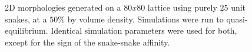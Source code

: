 \documentclass[twocolumn,a4,notitlepage]{report}
\begin{document}
\begin{figure}[htb]
\centering
{}
\caption{2D morphologies generated on a $80x80$ lattice using purely $25$ unit
snakes, at a $50\%$ by volume density. Simulations were run to
quasi-equilibrium. Identical simulation parameters were used for both,
except for the sign of the snake-snake affinity.}
\label{2d_morphology}

\end{figure}
\end{document}
